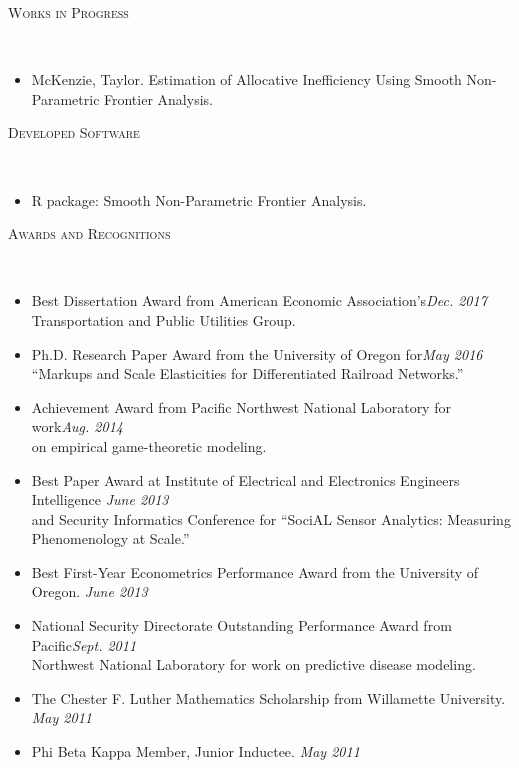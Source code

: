 \documentclass[11pt]{article}
\newenvironment{changemargin}[2]{%
  \begin{list}{}{%
    \setlength{\topsep}{0pt}%
    \setlength{\leftmargin}{#1}%
    \setlength{\rightmargin}{#2}%
    \setlength{\listparindent}{\parindent}%
    \setlength{\itemindent}{\parindent}%
    \setlength{\parsep}{\parskip}%
  }%
  \item[]}{\end{list}
}
\newcommand{\lineover}{
	\begin{changemargin}{-0.05in}{-0.05in}
		\vspace*{-8pt}
		\hrulefill \\
		\vspace*{-2pt}
	\end{changemargin}
}
\newcommand{\header}[1]{
	\begin{changemargin}{-0.5in}{-0.5in}
		\scshape{#1}\\
  	\lineover
	\end{changemargin}
}
\newenvironment{body} {
	\vspace*{-16pt}
	\begin{changemargin}{-0.25in}{-0.5in}
  }	
	{\end{changemargin}
}
\begin{document}
\smallskip
\header{Works in Progress}

\begin{body}
	\vspace{14pt}
	\begin{itemize}
		\item McKenzie, Taylor. Estimation of Allocative Inefficiency Using Smooth Non-Parametric Frontier Analysis.
	\end{itemize}
\end{body}

\smallskip
\header{Developed Software}
\begin{body}
	\vspace{14pt}
	\begin{itemize}
		\item R package: Smooth Non-Parametric Frontier Analysis.
	\end{itemize}
\end{body}

\smallskip
\header{Awards and Recognitions}

\begin{body}
	\vspace{14pt}
	\begin{itemize}
		\item Best Dissertation Award from American Economic Association's\hfill \emph{Dec. 2017}\\ Transportation and Public Utilities Group.
		\item Ph.D. Research Paper Award from the University of Oregon for\hfill \emph{May 2016}\\ ``Markups and Scale Elasticities for Differentiated Railroad Networks.''
		\item Achievement Award from Pacific Northwest National Laboratory for work\hfill \emph{Aug. 2014}\\ on empirical game-theoretic modeling. 
		\item Best Paper Award at Institute of Electrical and Electronics Engineers Intelligence \hfill \emph{June 2013}\\ and Security Informatics Conference for ``SociAL Sensor Analytics: Measuring\\ Phenomenology at Scale.''
		\item Best First-Year Econometrics Performance Award from the University of Oregon. \hfill \emph{June 2013}
		\item National Security Directorate Outstanding Performance Award from Pacific\hfill \emph{Sept. 2011}\\ Northwest National Laboratory for work on predictive disease modeling. 
		\item The Chester F. Luther Mathematics Scholarship from Willamette University. \hfill \emph{May 2011}
		\item Phi Beta Kappa Member, Junior Inductee. \hfill \emph{May 2011}
	\end{itemize}
\end{body}
\smallskip
\end{document}
